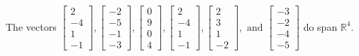 \begin{exercise}
\begin{exerciseStatement}
  \end{exerciseStatement}
  \begin{exerciseAnswer}
   The vectors \(\left[\begin{array}{r}
2 \\
-4 \\
1 \\
-1
\end{array}\right] , \left[\begin{array}{r}
-2 \\
-5 \\
-1 \\
-3
\end{array}\right] , \left[\begin{array}{r}
0 \\
9 \\
0 \\
4
\end{array}\right] , \left[\begin{array}{r}
2 \\
-4 \\
1 \\
-1
\end{array}\right] , \left[\begin{array}{r}
2 \\
3 \\
1 \\
-2
\end{array}\right] , \text{ and } \left[\begin{array}{r}
-3 \\
-2 \\
-4 \\
-5
\end{array}\right]\) 
  	 do  
	span \(\mathbb{R}^4\).
  


  \end{exerciseAnswer}
\end{exercise}
